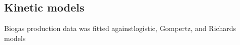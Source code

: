 \subsection{Kinetic models}
Biogas production data was fitted againstlogistic, Gompertz, and
Richards models